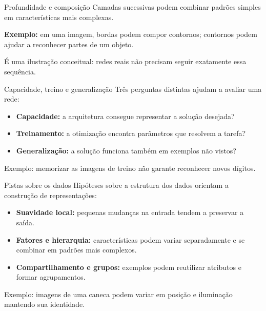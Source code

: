 \documentclass[aspectratio=169,11pt]{beamer}
\newcommand{\fonte}[1]{\par\smallskip{\footnotesize\color{Suave}#1}\par}
\begin{document}
\begin{frame}[t]{Profundidade e composição}
\medskip
Camadas sucessivas podem combinar padrões simples em características mais complexas.
\vfill
\centering
{}\par
\vfill
{\small\textbf{Exemplo:} em uma imagem, bordas podem compor contornos; contornos podem ajudar a reconhecer partes de um objeto.\par}
\smallskip
{\small\color{Suave}É uma ilustração conceitual: redes reais não precisam seguir exatamente essa sequência.\par}
\vfill\fonte{Seção 15.5}
\end{frame}

\begin{frame}[t]{Capacidade, treino e generalização}
\medskip
Três perguntas distintas ajudam a avaliar uma rede:
\vfill
\begin{itemize}
  \item \textbf{Capacidade:} a arquitetura consegue representar a solução desejada?
  \medskip
  \item \textbf{Treinamento:} a otimização encontra parâmetros que resolvem a tarefa?
  \medskip
  \item \textbf{Generalização:} a solução funciona também em exemplos não vistos?
\end{itemize}
\vfill
{\small\color{Suave}Exemplo: memorizar as imagens de treino não garante reconhecer novos dígitos.\par}
\end{frame}

\begin{frame}[t]{Pistas sobre os dados}
\medskip
Hipóteses sobre a estrutura dos dados orientam a construção de representações:
\vfill
\begin{itemize}
  \item \textbf{Suavidade local:} pequenas mudanças na entrada tendem a preservar a saída.
  \medskip
  \item \textbf{Fatores e hierarquia:} características podem variar separadamente e se combinar em padrões mais complexos.
  \medskip
  \item \textbf{Compartilhamento e grupos:} exemplos podem reutilizar atributos e formar agrupamentos.
\end{itemize}
\vfill
{\small\color{Suave}Exemplo: imagens de uma caneca podem variar em posição e iluminação mantendo sua identidade.\par}
\vfill\fonte{Seção 15.6}
\end{frame}
\end{document}
